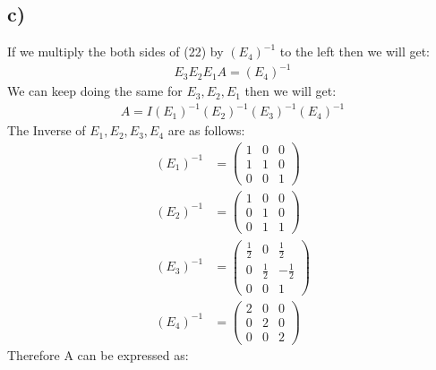 \documentclass[12pt]{article}
\begin{document}
\newpage

\subsection{c)}
If we multiply the both sides of (22) by $(E_4)^{-1}$ to the left then we will get:
\begin{align}
E_3E_2E_1A=(E_4)^{-1}
\end{align}
We can keep doing the same for $E_3,E_2,E_1$ then we will get:
\begin{align}
A=I(E_1)^{-1}(E_2)^{-1}(E_3)^{-1}(E_4)^{-1}
\end{align}
The Inverse of $E_1,E_2,E_3,E_4$ are as follows:
\begin{align*}
(E_1)^{-1}&=
\left(\begin{array}{ccc}
1 & 0 & 0 \\
1 & 1 & 0 \\
0 & 0 & 1
\end{array}\right)
\\
(E_2)^{-1}&=
\left(\begin{array}{ccc}
1 & 0 & 0 \\
0 & 1 & 0 \\
0 & 1 & 1
\end{array}\right)
\\
(E_3)^{-1}&=
\left(\begin{array}{ccc}
\frac{1}{2} & 0 & \frac{1}{2} \\
0 & \frac{1}{2} & -\frac{1}{2} \\
0 & 0 & 1
\end{array}\right)
\\
(E_4)^{-1}&=
\left(\begin{array}{ccc}
2 & 0 & 0 \\
0 & 2 & 0 \\
0 & 0 & 2
\end{array}\right)
\end{align*}
Therefore A can be expressed as:
\end{document}
